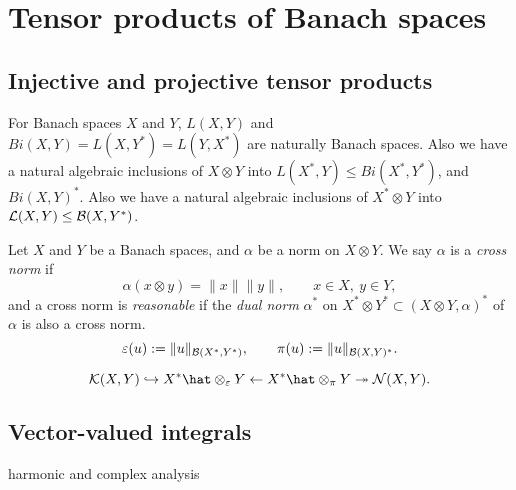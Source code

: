 \documentclass{../../large}
\begin{document}
\chapter{Tensor products of Banach spaces}

\section{Injective and projective tensor products}

\begin{prb}[Realizations]
For Banach spaces $X$ and $Y$, $L(X,Y)$ and $Bi(X,Y)=L(X,Y^*)=L(Y,X^*)$ are naturally Banach spaces.
Also we have a natural algebraic inclusions of $X\otimes Y$ into $L(X^*,Y)\le Bi(X^*,Y^*)$, and $Bi(X,Y)^*$.
Also we have a natural algebraic inclusions of $X^*\otimes Y$ into $\mathcal{L}(X,Y)\le\mathcal{B}(X,Y^*)$.
\end{prb}

\begin{prb}
Let $X$ and $Y$ be a Banach spaces, and $\alpha$ be a norm on $X\otimes Y$.
We say $\alpha$ is a \emph{cross norm} if
\[\alpha(x\otimes y)=\|x\|\|y\|,\qquad x\in X,\ y\in Y,\]
and a cross norm is \emph{reasonable} if the \emph{dual norm} $\alpha^*$ on $X^*\otimes Y^*\subset(X\otimes Y,\alpha)^*$ of $\alpha$ is also a cross norm.
\[\varepsilon(u):=\|u\|_{\mathcal{B}(X^*,Y^*)},\qquad\pi(u):=\|u\|_{\mathcal{B}(X,Y)^*}.\]
\end{prb}

\begin{prb}
\end{prb}

\begin{prb}
\[\cK(X,Y)\hookrightarrow X^*\hat\otimes_\e Y\leftarrow X^*\hat\otimes_\pi Y\twoheadrightarrow\cN(X,Y).\]
	
\end{prb}







\section{Vector-valued integrals}


harmonic and complex analysis
\end{document}
